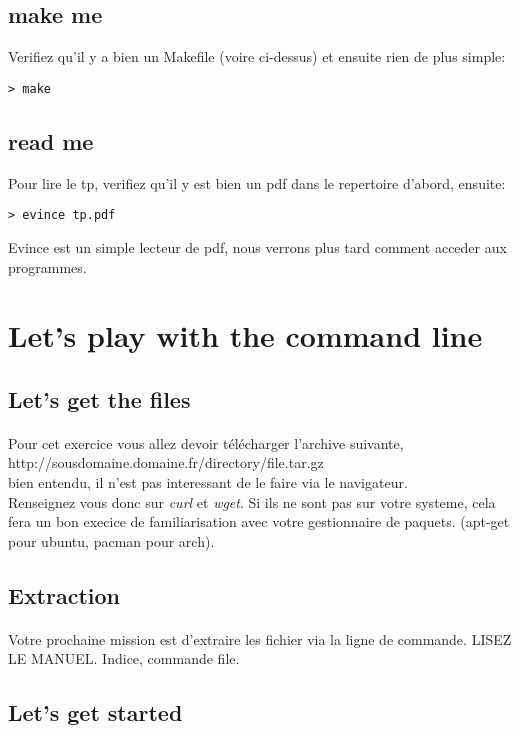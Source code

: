 \documentclass[a4paper]{article}
\begin{document}
\subsection{make me}
Verifiez qu'il y a bien un Makefile (voire ci-dessus) et ensuite rien de plus
simple:
\begin{lstlisting}
> make
\end{lstlisting}
\subsection{read me}
Pour lire le tp, verifiez qu'il y est bien un pdf dans le repertoire d'abord,
ensuite:
\begin{lstlisting}
> evince tp.pdf
\end{lstlisting}
Evince est un simple lecteur de pdf, nous verrons plus tard comment acceder aux
programmes.
\newpage


\section{Let's play with the command line}
\subsection{Let's get the files}
\paragraph{}Pour cet exercice vous allez devoir télécharger l'archive suivante,\\
http://sousdomaine.domaine.fr/directory/file.tar.gz \\ 
bien entendu, il n'est pas interessant de le faire via le navigateur.\\
Renseignez vous donc sur \emph{curl} et \emph{wget}. Si ils ne sont pas sur 
votre systeme, cela fera un bon execice de familiarisation avec votre gestionnaire 
de paquets. (apt-get pour ubuntu, pacman pour arch).

\subsection{Extraction}
\paragraph{}Votre prochaine mission est d'extraire les fichier via la ligne de 
commande. LISEZ LE MANUEL. Indice, commande file.

\subsection{Let's get started}
\end{document}
